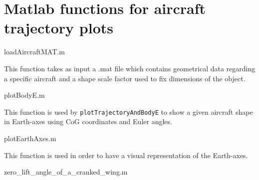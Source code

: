 \documentclass[[12pt,twoside]{book}
\begin{document}
%
%
\chapter%
   [Matlab functions for aircraft trajectory plots]%
   {Matlab functions for aircraft trajectory plots}
\label{chap:Appendix:Matlab:Trajectory}

%
    {loadAircraftMAT.m}
    
    This function takes as input a .mat file which contains geometrical data regarding a specific aircraft and a shape scale factor used to fix dimensions of the object.
    
%
    {plotBodyE.m}
  
  This function is used by \lstinline[basicstyle=\ttfamily]{plotTrajectoryAndBodyE} to show a given aircraft shape in Earth-axes using CoG coordinates and Euler angles.  
  
    {plotEarthAxes.m}
  
  This function is used in order to have a visual representation of the Earth-axes.
 
%
    {zero_lift_angle_of_a_cranked_wing.m}
\end{document}
